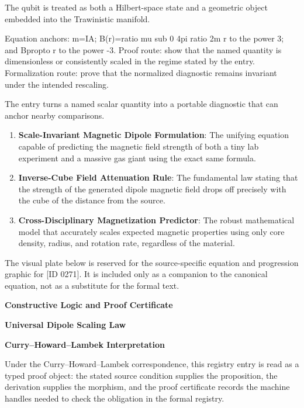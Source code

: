 The qubit is treated as both a Hilbert-space state and a geometric object embedded into the Trawinistic manifold.

Equation anchors: m=IA; B(r)=ratio mu sub 0 4pi ratio 2m r to the power 3; and Bpropto r to the power -3. Proof route: show that the named quantity is dimensionless or consistently scaled in the regime stated by the entry. Formalization route: prove that the normalized diagnostic remains invariant under the intended rescaling.

The entry turns a named scalar quantity into a portable diagnostic that can anchor nearby comparisons.
\endgroup

\begin{enumerate}[leftmargin=1.6em,itemsep=6pt,topsep=4pt]
\item \textbf{Scale-Invariant Magnetic Dipole Formulation}: The unifying equation capable of predicting the magnetic field strength of both a tiny lab experiment and a massive gas giant using the exact same formula.
\item \textbf{Inverse-Cube Field Attenuation Rule}: The fundamental law stating that the strength of the generated dipole magnetic field drops off precisely with the cube of the distance from the source.
\item \textbf{Cross-Disciplinary Magnetization Predictor}: The robust mathematical model that accurately scales expected magnetic properties using only core density, radius, and rotation rate, regardless of the material.
\end{enumerate}

\begingroup\footnotesize\sloppy
The visual plate below is reserved for the source-specific equation and progression graphic for [ID 0271]. It is included only as a companion to the canonical equation, not as a substitute for the formal text.
\par\endgroup
\ifTZPDarkEdition
{}
\fi

\clearpage
\begingroup\tzpsupportsetup
\noindent\textbf{\fontsize{10.8pt}{12.8pt}\selectfont [ID 0271] Constructive Logic and Proof Certificate}\par
\noindent\textbf{\fontsize{10pt}{12pt}\selectfont Universal Dipole Scaling Law}\par
\vspace{0.45em}
\begingroup
\footnotesize
\setlength{\parskip}{0.22em}
\setlength{\parindent}{0pt}
\noindent\textbf{Curry--Howard--Lambek Interpretation}\par
Under the Curry--Howard--Lambek correspondence, this registry entry is read as a typed proof
object: the stated source condition supplies the proposition, the derivation supplies the
morphism, and the proof certificate records the machine handles needed to check the obligation
in the formal registry.

